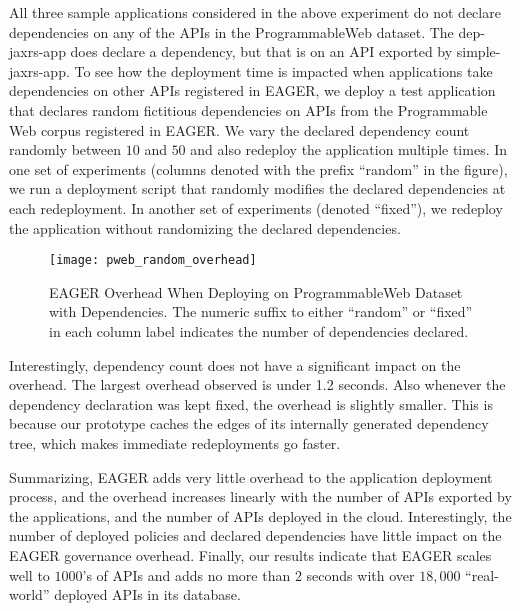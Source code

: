 All three sample applications considered in the above experiment do not declare dependencies on any of the APIs in the ProgrammableWeb
dataset. The dep-jaxrs-app does declare a dependency, but that is on an API exported by simple-jaxrs-app. To see how the deployment time is impacted
when applications take dependencies on other APIs registered in EAGER, we
deploy a test application that declares random fictitious dependencies on APIs
from the Programmable Web corpus registered in EAGER. 
We vary the declared dependency count randomly between $10$ and $50$ 
and also redeploy the application multiple times.
In one set of experiments (columns denoted with the prefix ``random'' in the
figure), we run a deployment script that randomly modifies the 
declared dependencies at each redeployment. In another set of 
experiments (denoted ``fixed''), we redeploy the application 
without randomizing the declared dependencies.

\begin{figure}
\centering
\texttt{[image: pweb\_random\_overhead]}
\caption{EAGER Overhead When Deploying on ProgrammableWeb Dataset with
Dependencies. The numeric suffix to either ``random'' or ``fixed'' in each
column
label indicates the number of dependencies declared.}
\label{fig:pweb_random_overhead}
\end{figure}


Interestingly, dependency count does not have a significant impact on 
the overhead. %
The largest overhead observed is under 1.2 seconds.
Also whenever the dependency declaration was kept fixed, the overhead is slightly smaller. This is because our prototype caches
the edges of its internally generated dependency tree, 
which makes immediate redeployments go faster.

Summarizing, 
EAGER adds very little overhead to the application deployment process, and the
overhead increases linearly with the number of APIs exported by the applications, and the number of APIs deployed in the cloud. 
Interestingly, the number of deployed policies and declared dependencies
have little impact on the EAGER governance overhead. Finally, our results indicate that EAGER scales
well to $1000$'s of APIs and adds no more than $2$ seconds with over
$18,000$ ``real-world''
deployed APIs in its database.
